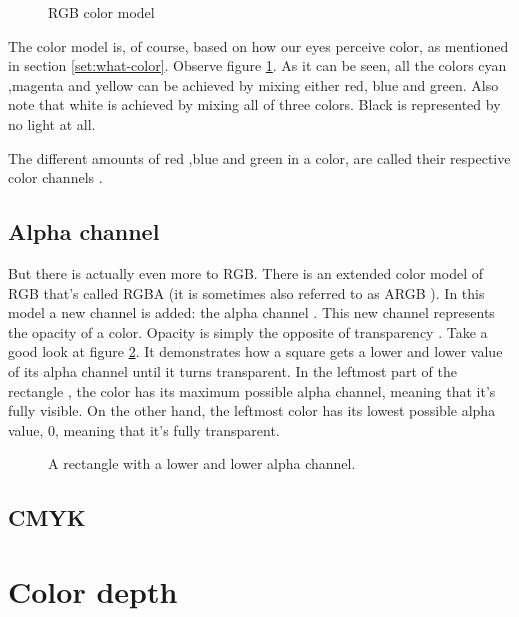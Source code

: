 \begin{refsection}
  \begin{figure}[h]
    \centering
    \caption{RGB color model}
    \label{fig:rgb}
  \end{figure}

  The color model is, of course, based on how our eyes perceive color,
  as mentioned in section \ref{set:what-color}. Observe figure
  \ref{fig:rgb}. As it can be seen, all the colors cyan ,magenta and
  yellow can be achieved by mixing either red, blue and green. Also note
  that white is achieved by mixing all of three colors. Black is
  represented by no light at all.

  The different amounts of red ,blue and green in a color, are called
  their respective color channels .

  \subsection{Alpha channel}
  \label{sec:alpha_chan}

  But there is actually even more to RGB. There is an extended color
  model of RGB that's called RGBA (it is sometimes also
  referred to as ARGB ). In this model a new channel is
  added: the alpha channel . This new channel
  represents the opacity of a color. Opacity is simply the opposite of
  transparency \cite{porter84_compos_dig_img}. Take
  a good look at figure \ref{fig:alpha}. It demonstrates how a square
  gets a lower and lower value of its alpha channel until it turns
  transparent. In the leftmost part of the rectangle , the color has
  its maximum possible alpha channel, meaning that it's fully
  visible. On the other hand, the leftmost color has its lowest
  possible alpha value, $0$, meaning that it's fully transparent.

  \begin{figure}[h!]
    \centering
    \caption{A rectangle with a lower and lower alpha channel.}
    \label{fig:alpha}
  \end{figure}

  \subsection{CMYK}
  \label{sec:cmyk}


  \section{Color depth}
  \label{sec:color-depth}


\end{refsection}
